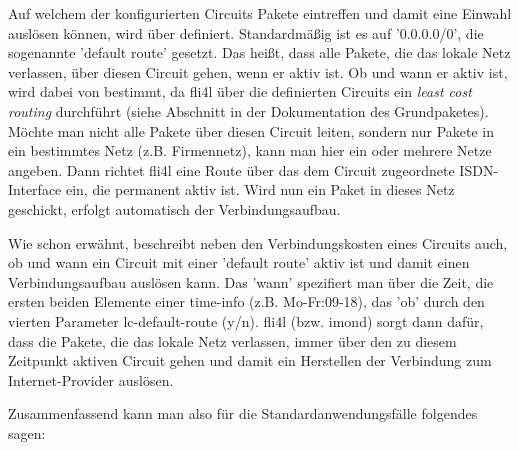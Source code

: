 Auf welchem der konfigurierten Circuits Pakete eintreffen und damit eine
Einwahl auslösen können, wird über 
definiert. Standardmäßig ist es auf '0.0.0.0/0', die sogenannte 'default route'
gesetzt. Das heißt, dass alle Pakete, die das lokale Netz verlassen, über diesen
Circuit gehen, wenn er aktiv ist. Ob und wann er aktiv ist, wird dabei von
 bestimmt, da fli4l über die definierten
Circuits ein \emph{least cost routing} durchführt (siehe Abschnitt
 in der
Dokumentation des Grundpaketes). Möchte man nicht alle Pakete über diesen
Circuit leiten, sondern nur Pakete in ein bestimmtes Netz (z.B.  Firmennetz),
kann man hier ein oder mehrere Netze angeben. Dann richtet fli4l eine Route
über das dem Circuit zugeordnete ISDN-Interface ein, die permanent aktiv ist.
Wird nun ein Paket in dieses Netz geschickt, erfolgt automatisch der 
Verbindungsaufbau.

Wie schon erwähnt, beschreibt  neben den
Verbindungskosten eines Circuits auch, ob und wann ein Circuit mit
einer 'default route' aktiv ist und damit einen Verbindungsaufbau
auslösen kann. Das 'wann' spezifiert man über die Zeit, die ersten
beiden Elemente einer time-info (z.B. Mo-Fr:09-18), das 'ob' durch den
vierten Parameter lc-default-route (y/n). fli4l (bzw. imond) sorgt
dann dafür, dass die Pakete, die das lokale Netz verlassen, immer über
den zu diesem Zeitpunkt aktiven Circuit gehen und damit ein Herstellen
der Verbindung zum Internet-Provider auslösen.

Zusammenfassend kann man also für die Standardanwendungsfälle
folgendes sagen: 

